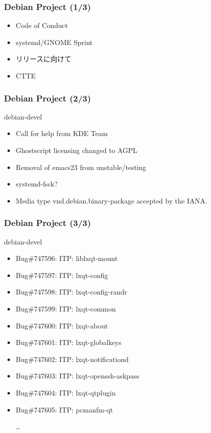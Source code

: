\documentclass[cjk,dvipdfmx,10pt,compress,%
hyperref={bookmarks=true,bookmarksnumbered=true,bookmarksopen=false,%
colorlinks=false,%
pdftitle={第 84 回 関西 Debian 勉強会},%
pdfauthor={倉敷・のがた・佐々木・かわだ・八津尾},%
pdfsubject={資料},%
}]{beamer}
\begin{document}
\begin{frame}[fragile]
  \frametitle{Debian Project (1/3)}
  \begin{block}{}
    \begin{itemize}
    \item Code of Conduct
    \item systemd/GNOME Sprint
    \item リリースに向けて
    \item CTTE
    \end{itemize}
  \end{block}
\end{frame}

\begin{frame}[fragile]
  \frametitle{Debian Project (2/3)}
  \begin{block}{debian-devel}
    \begin{itemize}
    \item Call for help from KDE Team
    \item Ghostscript licensing changed to AGPL
    \item Removal of emacs23 from unstable/testing
    \item systemd-fsck?
    \item Media type vnd.debian.binary-package accepted by the IANA.
    \end{itemize}
  \end{block}
\end{frame}

\begin{frame}[fragile]
  \frametitle{Debian Project (3/3)}
  \begin{block}{debian-devel}
    \begin{itemize}
    \item Bug\#747596: ITP: liblxqt-mount
    \item Bug\#747597: ITP: lxqt-config
    \item Bug\#747598: ITP: lxqt-config-randr
    \item Bug\#747599: ITP: lxqt-common
    \item Bug\#747600: ITP: lxqt-about
    \item Bug\#747601: ITP: lxqt-globalkeys
    \item Bug\#747602: ITP: lxqt-notificationd
    \item Bug\#747603: ITP: lxqt-openssh-askpass
    \item Bug\#747604: ITP: lxqt-qtplugin
    \item Bug\#747605: ITP: pcmanfm-qt

      …
    \end{itemize}
  \end{block}
\end{frame}
\end{document}
